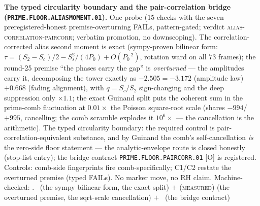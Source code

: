 \par\smallskip\noindent\textbf{The typed circularity boundary and
the pair-correlation bridge (\texttt{PRIME.FLOOR.ALIASMOMENT.01}).}
One probe ($15$ checks with the seven preregistered-honest
premise-overturning FAILs, pattern-gated; verdict
\textsc{alias-correlation-paircorr}; verbatim promotion, no
downscoping).  The correlation-corrected alias second moment is
exact (sympy-proven bilinear form: $\tau = (S_2 - S_c)/2 -
S_s^2/(4P_0) + O(P_0^{-2})$, rotation ward on all $73$ frames);
the round-25 premise ``the phases carry the gap'' is
\emph{overturned} --- the amplitudes carry it, decomposing the
tower exactly as $-2.505 = -3.172$ (amplitude law) $+ 0.668$
(fading alignment), with $q = S_c/S_2$ sign-changing and the deep
suppression only $\times1.1$; the exact Guinand split puts the
coherent sum in the prime-comb fluctuation at $0.01\times$ the
Poisson square-root scale (shares $-994$/$+995$, cancelling; the
comb scramble explodes it $10^6\times$ --- the cancellation is
the arithmetic).  The typed circularity boundary: the required
control is pair-correlation-equivalent substance, and by Guinand
the comb's self-cancellation \emph{is} the zero-side floor
statement --- the analytic-envelope route is closed honestly
(stop-list entry); the bridge contract
\texttt{PRIME.FLOOR.PAIRCORR.01} [O] is registered.  Controls:
comb-side fingerprints fire comb-specifically; C1/C2 restate the
overturned premise (typed FAILs).  No marker move, no RH claim.
Machine-checked: .
\mE\ (the sympy bilinear form, the exact split) $+$
(\textsc{measured}) (the overturned premise, the sqrt-scale
cancellation) $+$ \mO\ (the bridge contract)
\par\smallskip


